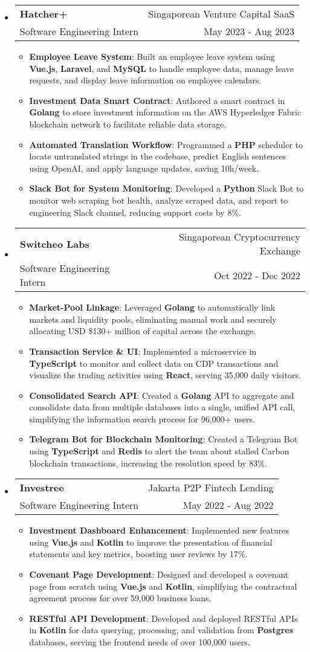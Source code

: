 \documentclass[letterpaper, 11pt]{article}
\makeatletter
\newcommand{\ResumeEntryTSDL}[4]{
  \vspace{1pt}\item
    \begin{tabular*}{\textwidth}[t]{l@{\extracolsep{\fill}}r} 
      \textbf{#1} & #2 \\
      #3 & #4 \\
    \end{tabular*}\vspace{-2.835pt} %
}
\newcommand{\ResumeItem}[2]{
  \item{
    \textbf{#1}{: #2 \vspace{-2.835pt}}
  }
}
\newcommand{\ResumeEntryStart}{\begin{itemize}[leftmargin=0mm, label={}]}
\newcommand{\ResumeEntryEnd}{\end{itemize}\vspace{-2.835pt}} %
\newcommand{\ResumeItemListStart}{\begin{itemize}[leftmargin=5mm, label=$\bullet$, itemsep=1mm, parsep=1mm]} %
\newcommand{\ResumeItemListEnd}{\end{itemize}}
\makeatother
\begin{document}
  \ResumeEntryStart
    \ResumeEntryTSDL{Hatcher+}{Singaporean Venture Capital SaaS}{Software Engineering Intern}{May 2023 - Aug 2023}
    \ResumeItemListStart
      \ResumeItem{Employee Leave System}
        {Built an employee leave system using \textbf{Vue.js}, \textbf{Laravel}, and \textbf{MySQL} to handle employee data, manage leave requests, and display leave information on employee calendars.}
      \ResumeItem{Investment Data Smart Contract}
        {Authored a smart contract in \textbf{Golang} to store investment information on the AWS Hyperledger Fabric blockchain network to facilitate reliable data storage.}
      \ResumeItem{Automated Translation Workflow}
      {Programmed a \textbf{PHP} scheduler to locate untranslated strings in the codebase, predict English sentences using OpenAI, and apply language updates, saving 10h/week.}
      \ResumeItem{Slack Bot for System Monitoring}
      {Developed a \textbf{Python} Slack Bot to monitor web scraping bot health, analyze scraped data, and report to engineering Slack channel, reducing support costs by 8\%.}
    \ResumeItemListEnd
  \ResumeEntryEnd

  \ResumeEntryStart
    \ResumeEntryTSDL{Switcheo Labs}{Singaporean Cryptocurrency Exchange}{Software Engineering Intern}{Oct 2022 - Dec 2022}
    \ResumeItemListStart
    \ResumeItem{Market-Pool Linkage}
      {Leveraged \textbf{Golang} to automatically link markets and liquidity pools, eliminating manual work and securely allocating USD \$130+ million of capital across the exchange.}
    \ResumeItem{Transaction Service \& UI}
      {Implemented a microservice in \textbf{TypeScript} to monitor and collect data on CDP transactions and visualize the trading activities using \textbf{React}, serving 35,000 daily visitors.}
    \ResumeItem{Consolidated Search API}
      {Created a \textbf{Golang} API to aggregate and consolidate data from multiple databases into a single, unified API call, simplifying the information search process for 96,000+ users.}
    \ResumeItem{Telegram Bot for Blockchain Monitoring}
      {Created a Telegram Bot using \textbf{TypeScript} and \textbf{Redis} to alert the team about stalled Carbon blockchain transactions, increasing the resolution speed by 83\%.}
    \ResumeItemListEnd
  \ResumeEntryEnd

  \ResumeEntryStart
    \ResumeEntryTSDL{Investree}{Jakarta P2P Fintech Lending}{Software Engineering Intern}{May 2022 - Aug 2022}
    \ResumeItemListStart
      \ResumeItem{Investment Dashboard Enhancement}
      {Implemented new features using \textbf{Vue.js} and \textbf{Kotlin} to improve the presentation of financial statements and key metrics, boosting user reviews by 17\%.}
      \ResumeItem{Covenant Page Development}
        {Designed and developed a covenant page from scratch using \textbf{Vue.js} and \textbf{Kotlin}, simplifying the contractual agreement process for over 59,000 business loans.}
      \ResumeItem{RESTful API Development}
        {Developed and deployed RESTful APIs in \textbf{Kotlin} for data querying, processing, and validation from \textbf{Postgres} databases, serving the frontend needs of over 100,000 users.}
    \ResumeItemListEnd
  \ResumeEntryEnd
\end{document}
